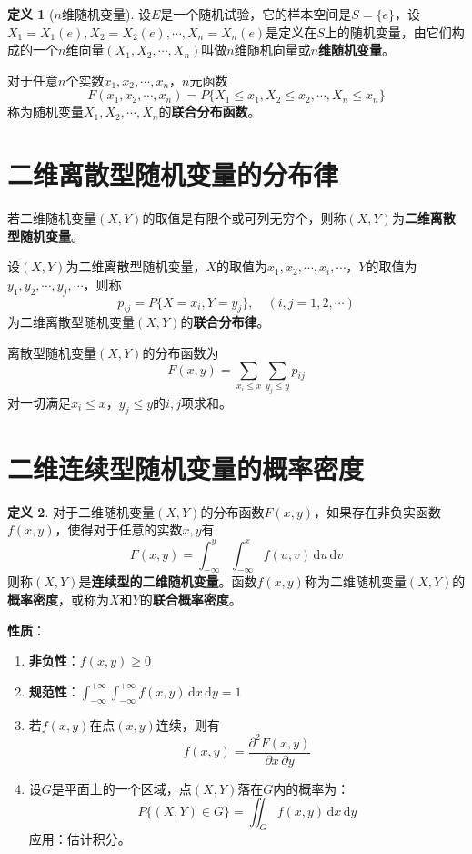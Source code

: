 \documentclass[11pt,a4paper]{report}
\theoremstyle{definition}
\newtheorem{definition}{定义}[chapter]
\theoremstyle{plain}
\begin{document}
\begin{definition}[\(n\)维随机变量]
设\(E\)是一个随机试验，它的样本空间是\(S=\{e\}\)，设\(X_1=X_1(e),X_2=X_2(e),\cdots,X_n=X_n(e)\)是定义在\(S\)上的随机变量，由它们构成的一个\(n\)维向量\((X_1,X_2,\cdots,X_n)\)叫做\(n\)维随机向量或\textbf{\(n\)维随机变量}。

对于任意\(n\)个实数\(x_1,x_2,\cdots,x_n\)，\(n\)元函数
\[
F(x_1,x_2,\cdots,x_n)=P\{X_1\leq x_1,X_2\leq x_2,\cdots,X_n\leq x_n\}
\]
称为随机变量\(X_1,X_2,\cdots,X_n\)的\textbf{联合分布函数}。
\end{definition}

\section{二维离散型随机变量的分布律}

若二维随机变量\((X,Y)\)的取值是有限个或可列无穷个，则称\((X,Y)\)为\textbf{二维离散型随机变量}。

设\((X,Y)\)为二维离散型随机变量，\(X\)的取值为\(x_1,x_2,\cdots,x_i,\cdots\)，\(Y\)的取值为\(y_1,y_2,\cdots,y_j,\cdots\)，则称
\[
p_{ij}=P\{X=x_i,Y=y_j\},\quad(i,j=1,2,\cdots)
\]
为二维离散型随机变量\((X,Y)\)的\textbf{联合分布律}。

离散型随机变量\((X,Y)\)的分布函数为
\[
F(x,y)=\sum_{x_i\leq x}\sum_{y_j\leq y}p_{ij}
\]
对一切满足\(x_i\leq x\)，\(y_j\leq y\)的\(i,j\)项求和。

\section{二维连续型随机变量的概率密度}

\begin{definition}
对于二维随机变量\((X,Y)\)的分布函数\(F(x,y)\)，如果存在非负实函数\(f(x,y)\)，使得对于任意的实数\(x,y\)有
\[
F(x,y)=\int_{-\infty}^{y}\int_{-\infty}^{x}f(u,v)\,\mathrm{d}u\,\mathrm{d}v
\]
则称\((X,Y)\)是\textbf{连续型的二维随机变量}。函数\(f(x,y)\)称为二维随机变量\((X,Y)\)的\textbf{概率密度}，或称为\(X\)和\(Y\)的\textbf{联合概率密度}。
\end{definition}

\textbf{性质}：
\begin{enumerate}[label=\arabic*.,leftmargin=2em]
    \item \textbf{非负性}：\(f(x,y)\geq 0\)
    \item \textbf{规范性}：\(\displaystyle\int_{-\infty}^{+\infty}\int_{-\infty}^{+\infty}f(x,y)\,\mathrm{d}x\,\mathrm{d}y=1\)
    \item 若\(f(x,y)\)在点\((x,y)\)连续，则有
    \[
    f(x,y)=\frac{\partial^2 F(x,y)}{\partial x\,\partial y}
    \]
    \item 设\(G\)是平面上的一个区域，点\((X,Y)\)落在\(G\)内的概率为：
    \[
    P\{(X,Y)\in G\}=\iint_G f(x,y)\,\mathrm{d}x\,\mathrm{d}y
    \]
    应用：估计积分。
\end{enumerate}
\end{document}

